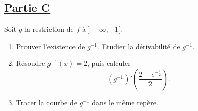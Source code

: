 \documentclass[12pt,a4paper]{article}
\begin{document}
\subsection*{\underline{\textbf{Partie C}}}

Soit \( g \) la restriction de \( f \) à \( ]-\infty, -1[ \).

\begin{enumerate}
    \item Prouver l’existence de \( g^{-1} \). Etudier la dérivabilité de \( g^{-1} \).
    \item Résoudre \( g^{-1}(x) = 2 \), puis calculer  
    \[
    \left( g^{-1}\right)' \left( \frac{2-e^{-\frac{1}{2}}}{2} \right).
    \]
    \item Tracer la courbe de \( g^{-1} \) dans le même repère.
\end{enumerate}
\end{document}
